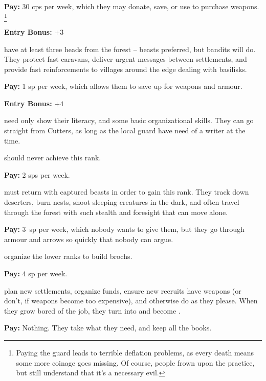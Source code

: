 \begin{multicols}{2}
\begin{description}
  \textbf{Pay:} 30 \glspl{cp} per week, which they may donate, save, or use to purchase weapons.%
  \footnote{Paying the \gls{guard} leads to terrible deflation problems, as every death means some more coinage goes missing.
  Of course, people frown upon the practice, but still understand that it's a necessary evil.}

  \textbf{Entry Bonus:} $+3$

  \item[\Glspl{ranger}]
  \label{ranger}
  have at least three heads from the forest -- beasts preferred, but bandits will do.
  They protect fast caravans, deliver urgent messages between settlements, and provide fast reinforcements to \glspl{village} around the \gls{edge} dealing with basilisks.

  \textbf{Pay:} 1 \gls{sp} per week, which allows them to save up for weapons and armour.

  \textbf{Entry Bonus:} $+4$

  \item[\Glspl{jotter}]
  \label{jotter}%
  need only show their literacy, and some basic organizational skills.
  They can go straight from Cutters, as long as the local \gls{guard} have need of a writer at the time.

   should never achieve this rank.

  \textbf{Pay:} 2 \glspl{sp} per week.

  \item[\Glspl{thane}]
  \label{thanes}
  must return with captured beasts in order to gain this rank.
  They track down deserters, burn nests, shoot sleeping creatures in the dark, and often travel through the forest with such stealth and foresight that can move alone.
  
  \textbf{Pay:} 3~\gls{sp} per week, which nobody wants to give them, but they go through armour and arrows so quickly that nobody can argue.

  organize the lower ranks to build \glspl{broch}.

  \textbf{Pay:} 4 \gls{sp} per week.

  plan new settlements, organize funds, ensure new recruits have weapons (or don't, if weapons become too expensive), and otherwise do as they please.
  When they grow bored of the job, they turn  into  and become .

  \textbf{Pay:} Nothing.
  They take what they need, and keep all the books.


\end{description}
\end{multicols}
